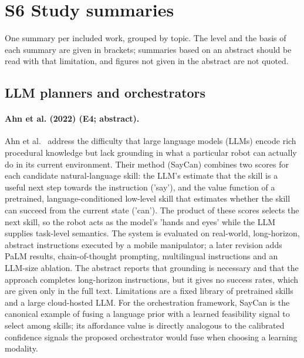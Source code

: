 \documentclass[10pt,a4paper]{article}
\begin{document}
\section*{S6 Study summaries}
One summary per included work, grouped by topic. The level and the basis of each summary are given in brackets; summaries based on an abstract should be read with that limitation, and figures not given in the abstract are not quoted.
\subsection*{LLM planners and orchestrators}
\paragraph{Ahn et al. (2022) (E4; abstract).} Ahn et al.~\cite{Ahn2022} address the difficulty that large language models (LLMs) encode rich procedural knowledge but lack grounding in what a particular robot can actually do in its current environment. Their method (SayCan) combines two scores for each candidate natural-language skill: the LLM's estimate that the skill is a useful next step towards the instruction ('say'), and the value function of a pretrained, language-conditioned low-level skill that estimates whether the skill can succeed from the current state ('can'). The product of these scores selects the next skill, so the robot acts as the model's 'hands and eyes' while the LLM supplies task-level semantics. The system is evaluated on real-world, long-horizon, abstract instructions executed by a mobile manipulator; a later revision adds PaLM results, chain-of-thought prompting, multilingual instructions and an LLM-size ablation. The abstract reports that grounding is necessary and that the approach completes long-horizon instructions, but it gives no success rates, which are given only in the full text. Limitations are a fixed library of pretrained skills and a large cloud-hosted LLM. For the orchestration framework, SayCan is the canonical example of fusing a language prior with a learned feasibility signal to select among skills; its affordance value is directly analogous to the calibrated confidence signals the proposed orchestrator would fuse when choosing a learning modality.
\end{document}
